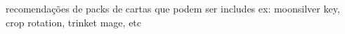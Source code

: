recomendações de packs de cartas que podem ser includes ex: moonsilver key, crop rotation, trinket mage, etc